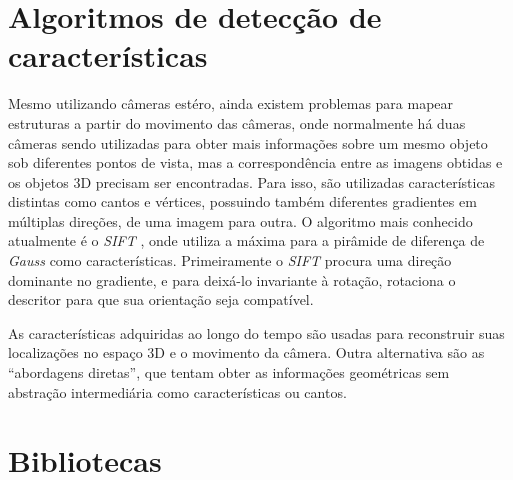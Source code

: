 \section{Algoritmos de detecção de características}
  
Mesmo utilizando câmeras estéro, ainda existem problemas para mapear estruturas a partir do movimento das câmeras, onde normalmente há duas câmeras sendo utilizadas para obter mais informações sobre um mesmo objeto sob diferentes pontos de vista, mas a correspondência entre as imagens obtidas e os objetos 3D precisam ser encontradas. Para isso, são utilizadas características distintas como cantos e vértices, possuindo também diferentes gradientes em múltiplas direções, de uma imagem para outra. O algoritmo mais conhecido atualmente é o \textit{SIFT} \cite{SIFT}, onde utiliza a máxima para a pirâmide de diferença de \textit{Gauss} como características. Primeiramente o \textit{SIFT} procura uma direção dominante no gradiente, e para deixá-lo invariante à rotação, rotaciona o descritor para que sua orientação seja compatível.
  
  As características adquiridas ao longo do tempo são usadas para reconstruir suas localizações no espaço 3D e o movimento da câmera. Outra alternativa são as “abordagens diretas”, que tentam obter as informações geométricas sem abstração intermediária como características ou cantos.
  
\section{Bibliotecas}
  
